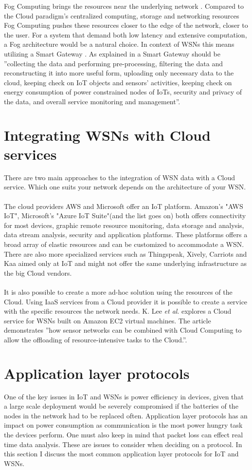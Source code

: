 \documentclass[]{uiophd}
\begin{document}
Fog Computing brings the resources near the underlying network \parencite{6984239}. Compared to the Cloud paradigm's centralized computing, storage and networking resources Fog Computing pushes these resources closer to the edge of the network, closer to the user. For a system that demand both low latency and extensive computation, a Fog architecture would be a natural choice. In context of WSNs this means utilizing a Smart Gateway \parencite{6984239}. As explained in \parencite{69842392} a Smart Gateway should be ''collecting the data and performing pre-processing, filtering the data and reconstructing it into more useful form, uploading only necessary data to the cloud, keeping check on IoT objects and sensors’ activities, keeping check on energy consumption of power constrained nodes of IoTs, security and privacy of the data, and overall service monitoring and management''. 

\section{Integrating WSNs with Cloud services}
There are two main approaches to the integration of WSN data with a Cloud service. Which one suits your network depends on the architecture of your WSN.
\\\\
The cloud providers AWS and Microsoft offer an IoT platform. Amazon's "AWS IoT", Microsoft's "Azure IoT Suite"(and the list goes on) both offers connectivity for most devices, graphic remote resource monitoring, data storage and analysis, data stream analysis, security and application platforms. These platforms offers a broad array of elastic resources and can be customized to accommodate a WSN. There are also more specialized services such as Thingspeak, Xively, Carriots and Kaa aimed only at IoT and might not offer the same underlying infrastructure as the big Cloud vendors.
\\\\
It is also possible to create a more ad-hoc solution using the resources of the Cloud. Using IaaS services from a Cloud provider it is possible to create a service with the specific resources the network needs. K. Lee \textit{et al}. \parencite{5678063} explores a Cloud service for WSNs built on Amazon EC2 virtual machines. The article demonstrates ''how sensor networks can be combined with Cloud Computing to allow the offloading of resource-intensive tasks to the Cloud.''\parencite{56780637}.

\section{Application layer protocols}
One of the key issues in IoT and WSNs is power efficiency in devices, given that a large scale deployment would be severely compromised if the batteries of the nodes in the network had to be replaced often. Application layer protocols has an impact on power consumption as communication is the most power hungry task the devices perform. One must also keep in mind that packet loss can effect real time data analysis. These are issues to consider when deciding on a protocol. In this section I discuss the most common application layer protocols for IoT and WSNs.
\end{document}
